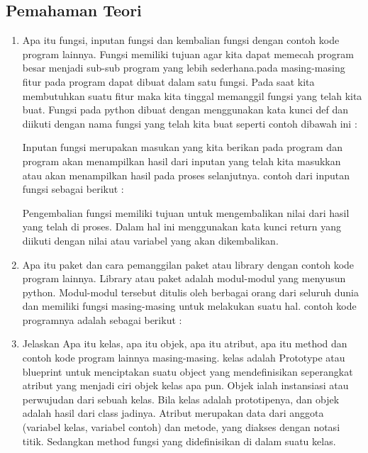 \subsection{Pemahaman Teori}
\begin{enumerate}
    \item Apa itu fungsi, inputan fungsi dan kembalian fungsi dengan contoh kode program lainnya.
Fungsi memiliki tujuan agar kita dapat memecah program besar menjadi sub-sub program yang lebih sederhana.pada masing-masing  fitur pada program dapat dibuat dalam satu fungsi. Pada saat kita membutuhkan suatu fitur maka kita tinggal memanggil fungsi yang telah kita buat. Fungsi pada python dibuat dengan menggunakan kata kunci def dan diikuti dengan nama fungsi yang telah kita buat seperti contoh dibawah ini :
 
Inputan fungsi merupakan masukan yang kita berikan pada program dan program akan menampilkan hasil dari inputan yang telah kita masukkan atau akan menampilkan hasil pada proses selanjutnya. contoh dari inputan fungsi sebagai berikut :
 
Pengembalian fungsi memiliki tujuan untuk mengembalikan nilai dari hasil yang telah di proses. Dalam hal ini menggunakan kata kunci return yang diikuti dengan nilai atau variabel yang akan dikembalikan.
 

    \item Apa itu paket dan cara pemanggilan paket atau library dengan contoh kode program lainnya.
Library atau paket adalah modul-modul yang menyusun python. Modul-modul tersebut ditulis oleh berbagai orang dari seluruh dunia dan memiliki fungsi masing-masing untuk melakukan suatu hal. contoh kode programnya adalah sebagai berikut :
 

    \item Jelaskan Apa itu kelas, apa itu objek, apa itu atribut, apa itu method dan contoh kode program lainnya masing-masing.
kelas adalah Prototype atau blueprint untuk menciptakan suatu object  yang mendefinisikan seperangkat atribut yang menjadi ciri objek kelas apa pun. Objek ialah instansiasi atau perwujudan dari sebuah kelas. Bila kelas adalah prototipenya, dan objek adalah hasil dari class jadinya. Atribut merupakan data dari anggota (variabel kelas, variabel contoh) dan metode, yang diakses dengan notasi titik. Sedangkan method fungsi yang didefinisikan di dalam suatu kelas.
 


\end{enumerate}
